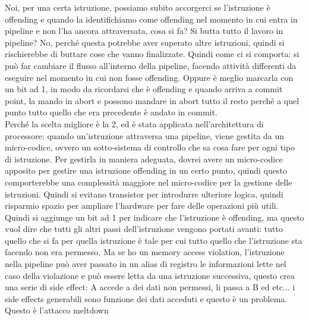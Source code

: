 \documentclass[14pt]{article}
\begin{document}
Noi, per una certa istruzione, possiamo subito accorgerci se l'istruzione è offending e quando la identifichiamo come offending nel momento in cui entra in pipeline e non l'ha ancora attraversata, cosa si fa? Si butta tutto il lavoro in pipeline? No, perché questa potrebbe aver superato altre istruzioni, quindi si rischierebbe di buttare cose che vanno finalizzate. Quindi come ci si comporta: si può far cambiare il flusso all'interno della pipeline, facendo attività differenti da eseguire nel momento in cui non fosse offending. Oppure è meglio marcarla con un bit ad 1, in modo da ricordarsi che è offending e quando arriva a commit point, la mando in abort e possono mandare in abort tutto il resto perché a quel punto tutto quello che era precedente è andato in commit.\\ Perché la scelta migliore è la 2, ed è stata applicata nell'architettura di processore: quando un'istruzione attraversa una pipeline, viene gestita da un micro-codice, ovvero un sotto-sistema di controllo che sa cosa fare per ogni tipo di istruzione. Per gestirla in maniera adeguata, dovrei avere un micro-codice apposito per gestire una istruzione offending in un certo punto, quindi questo comporterebbe una complessità maggiore nel micro-codice per la gestione delle istruzioni. Quindi si evitano transistor per introdurre ulteriore logica, quindi risparmio spazio per ampliare l'hardware per fare delle operazioni più utili.\\ Quindi si aggiunge un bit ad 1 per indicare che l'istruzione è offending, ma questo vuol dire che tutti gli altri passi dell'istruzione vengono portati avanti: tutto quello che si fa per quella istruzione è tale per cui tutto quello che l'istruzione sta facendo non era permesso. Ma se ho un memory access violation, l'istruzione nella pipeline può aver passato in un alias di registro le informazioni lette nel caso della violazione e può essere letta da una istruzione successiva, questo crea una serie di side effect: A accede a dei dati non permessi, li passa a B ed etc... i side effects generabili sono funzione dei dati acceduti e questo è un problema.\\ Questo è l'attacco meltdown
\end{document}
